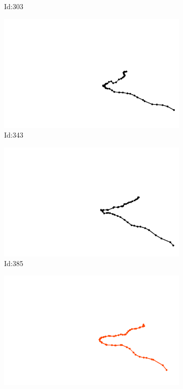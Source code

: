 \documentclass[12pt,twoside]{report}
\begin{document}
\begin{figure}
\begin{subfigure}[b]{0.20\textwidth}
\caption{Id:303}
\end{subfigure}
\begin{subfigure}[b]{0.20\textwidth}
\centering
\includegraphics[width=\textwidth]{../../trajectories/343.png}
\caption{Id:343}
\end{subfigure}
\begin{subfigure}[b]{0.20\textwidth}
\centering
\includegraphics[width=\textwidth]{../../trajectories/385.png}
\caption{Id:385}
\end{subfigure}
\begin{subfigure}[b]{0.20\textwidth}
\centering
\includegraphics[width=\textwidth]{../../trajectories/398.png}

\end{subfigure}
\end{figure}
\end{document}

